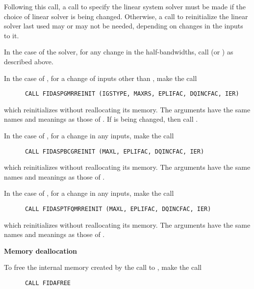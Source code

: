 \begin{Steps}
  Following this call, a call to specify the linear system solver must be
  made if the choice of linear solver is being changed.  Otherwise, a call
  to reinitialize the linear solver last used may or may not be needed,
  depending on changes in the inputs to it.

  In the case of the {\band} solver, for any change in the half-bandwidths,
  call  (or ) as described above.

  In the case of {\spgmr}, for a change of inputs other than ,
  make the call
\begin{verbatim}
      CALL FIDASPGMRREINIT (IGSTYPE, MAXRS, EPLIFAC, DQINCFAC, IER)
\end{verbatim}
  which reinitializes {\spgmr} without reallocating its memory.
  The arguments have the same names and meanings as those of .
  If  is being changed, then call .

  In the case of {\spbcg}, for a change in any inputs, make the call
\begin{verbatim}
      CALL FIDASPBCGREINIT (MAXL, EPLIFAC, DQINCFAC, IER)
\end{verbatim}
  which reinitializes {\spbcg} without reallocating its memory.
  The arguments have the same names and meanings as those of .

  In the case of {\sptfqmr}, for a change in any inputs, make the call
\begin{verbatim}
      CALL FIDASPTFQMRREINIT (MAXL, EPLIFAC, DQINCFAC, IER)
\end{verbatim}
  which reinitializes {\sptfqmr} without reallocating its memory.
  The arguments have the same names and meanings as those of .

\item {\bf Memory deallocation}

  To free the internal memory created by the call to ,
  make the call
\begin{verbatim}
      CALL FIDAFREE
\end{verbatim}

\end{Steps}


